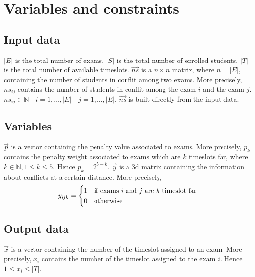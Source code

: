 \section*{Variables and constraints}
\subsection*{Input data}
$ |E| $ is the total number of exams.
\newline
$ |S| $ is the total number of enrolled students.
\newline
$ |T| $ is the total number of available timeslots.
\newline
$ \vec{ns} $ is a $ n \times n $ matrix, where $ n = |E| $, containing the number of students in conflit among two exams. More precisely, $ ns_{ij} $ contains the number of students in conflit among the exam $i$ and the exam $j$.
\newline
$ ns_{ij} \in \mathbb{N} \quad i = 1, \dots , |E| \quad j = 1, \dots , |E| $.
\newline
$ \vec{ns} $ is built directly from the input data.

\subsection*{Variables}
$ \vec{p} $ is a vector containing the penalty value associated to exams. More precisely, $ p_{k} $ contains the penalty weight associated to exams which are $k$ timeslots far, where $ k \in \mathbb{N}, 1 \le k \le 5 $. Hence $p_{k} = 2^{5-k}$.
\newline
$ \vec{y} $ is a 3d matrix containing the information about conflicts at a certain distance. More precisely, 
\[
y_{ijk} = 
\begin{cases}
1	&	\text{if exams $ i $ and $ j $ are $k$ timeslot far}	\\
0	&	\text{otherwise}
\end{cases}
\]

\subsection*{Output data}
$ \vec{x} $ is a vector containing the number of the timeslot assigned to an exam. More precisely, $ x_{i} $ contains the number of the timeslot assigned to the exam $i$. Hence $ 1 \le x_{i} \le |T| $.

